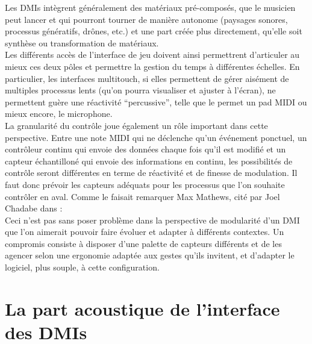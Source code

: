 \noindent Les \glspl{DMI} intègrent généralement des matériaux pré-composés, que le musicien peut lancer et qui pourront tourner de manière autonome (paysages sonores, processus génératifs, drônes, etc.) et une part créée plus directement, qu'elle soit synthèse ou transformation de matériaux.\\
\indent Les différents accès de l'interface de jeu doivent ainsi permettrent d'articuler au mieux ces deux pôles et permettre la gestion du temps à différentes échelles. En particulier, les interfaces multitouch, si elles permettent de gérer aisément de multiples processus lents (qu'on pourra visualiser et ajuster à l'écran), ne permettent guère une réactivité ``percussive'', telle que le permet un pad \gls{MIDI} ou mieux encore, le microphone.\\
\indent La granularité du contrôle joue également un rôle important dans cette perspective. Entre une note \gls{MIDI} qui ne déclenche qu'un événement ponctuel, un contrôleur continu qui envoie des données chaque fois qu'il est modifié et un capteur échantilloné qui envoie des informations en continu, les possibilités de contrôle seront différentes en terme de réactivité et de finesse de modulation. Il faut donc prévoir les capteurs adéquats pour les processus que l'on souhaite contrôler en aval. Comme le faisait remarquer Max Mathews, cité par Joel Chadabe dans \cite{chadabe_electric_1996}:
\\
\indent Ceci n'est pas sans poser problème dans la perspective de modularité d'un \gls{DMI} que l'on aimerait pouvoir faire évoluer et adapter à différents contextes. Un compromis consiste à disposer d'une palette de capteurs différents et de les agencer selon une ergonomie adaptée aux gestes qu'ils invitent, et d'adapter le logiciel, plus souple, à cette configuration.

\section{La part acoustique de l'interface des DMIs}
\label{sec:interfaces:part_acoustique}

